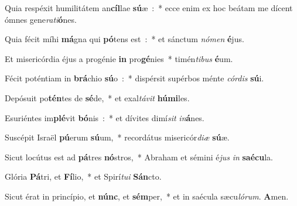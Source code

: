 \item Quia respéxit humilitátem an\textbf{cíl}\-lae \textbf{sú}\-æ~:~* ecce enim ex hoc beátam me dícent ómnes gene\emph{ra}\emph{ti}\textbf{ó}nes.
\item Quia fécit míhi \textbf{má}\-gna qui \textbf{pó}\-tens est~:~* et sánctum \emph{nó}\-\emph{men} \textbf{é}jus.
\item Et misericórdia éjus a progénie \textbf{in} pro\textbf{gé}\-nies~* timén\emph{ti}\-\emph{bus} \textbf{é}um.
\item Fécit poténtiam in \textbf{brá}\-chio \textbf{sú}\-o~:~* dispérsit supérbos ménte \emph{cór}\-\emph{dis} \textbf{sú}i.
\item Depósuit po\textbf{tén}\-tes de \textbf{sé}\-de,~* et exal\emph{tá}\-\emph{vit} \textbf{hú}\textbf{mi}les.
\item Esuriéntes im\textbf{plé}\-vit \textbf{bó}\-nis~:~* et dívites dimí\emph{sit} \emph{in}\textbf{á}nes.
\item Suscépit Israël \textbf{pú}\-erum \textbf{sú}\-um,~* recordátus misericór\emph{di}\-\emph{æ} \textbf{sú}æ.
\item Sicut locútus est ad \textbf{pá}\-tres \textbf{nó}\-stros,~* Abraham et sémini é\emph{jus} \emph{in} \textbf{saé}\textbf{cu}la.
\item Glória \textbf{Pá}\-tri, et \textbf{Fí}\-lio,~* et Spirí\emph{tu}\-\emph{i} \textbf{Sán}cto.
\item Sicut érat in princípio, et \textbf{núnc}, et \textbf{sém}\-per,~* et in saécula sæcu\emph{ló}\-\emph{rum}. \textbf{A}men.